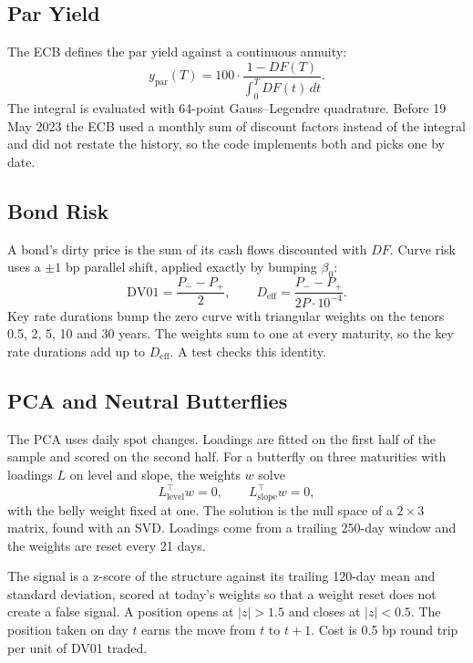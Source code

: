 \documentclass[11pt,a4paper]{article}
\begin{document}
\subsection{Par Yield}

The ECB defines the par yield against a continuous annuity:
\begin{equation}
y_{\text{par}}(T)=100\cdot\frac{1-DF(T)}{\int_0^T DF(t)\,dt}.
\end{equation}
The integral is evaluated with 64-point Gauss--Legendre quadrature. Before 19 May 2023 the ECB used a monthly sum of discount factors instead of the integral and did not restate the history, so the code implements both and picks one by date.

\subsection{Bond Risk}

A bond's dirty price is the sum of its cash flows discounted with $DF$. Curve risk uses a $\pm1$ bp parallel shift, applied exactly by bumping $\beta_0$:
\begin{equation}
\text{DV01}=\frac{P_{-}-P_{+}}{2},\qquad
D_{\text{eff}}=\frac{P_{-}-P_{+}}{2P\cdot 10^{-4}}.
\end{equation}
Key rate durations bump the zero curve with triangular weights on the tenors 0.5, 2, 5, 10 and 30 years. The weights sum to one at every maturity, so the key rate durations add up to $D_{\text{eff}}$. A test checks this identity.

\subsection{PCA and Neutral Butterflies}

The PCA uses daily spot changes. Loadings are fitted on the first half of the sample and scored on the second half. For a butterfly on three maturities with loadings $L$ on level and slope, the weights $w$ solve
\begin{equation}
L_{\text{level}}^{\top}w=0,\qquad L_{\text{slope}}^{\top}w=0,
\end{equation}
with the belly weight fixed at one. The solution is the null space of a $2\times3$ matrix, found with an SVD. Loadings come from a trailing 250-day window and the weights are reset every 21 days.

The signal is a z-score of the structure against its trailing 120-day mean and standard deviation, scored at today's weights so that a weight reset does not create a false signal. A position opens at $|z|>1.5$ and closes at $|z|<0.5$. The position taken on day $t$ earns the move from $t$ to $t+1$. Cost is 0.5 bp round trip per unit of DV01 traded.
\end{document}
